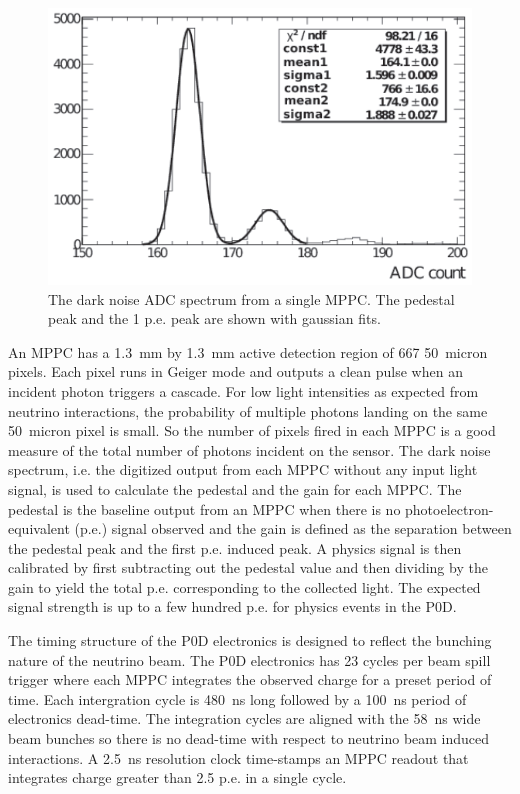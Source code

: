 \begin{figure}
\begin{center}
\includegraphics[width=6in]{./Figures/pedestal.png}
\end{center}
\caption{The dark noise ADC spectrum from a single MPPC. The pedestal
  peak and the 1 p.e. peak are shown with gaussian fits.}
\label{fig:pedestal}
\end{figure}

An MPPC has a 1.3~mm by 1.3~mm active detection region of 667 50~micron
pixels. Each pixel runs in Geiger mode and outputs a clean pulse when
an incident photon triggers a cascade. For low light intensities as
expected from neutrino interactions, the probability of multiple
photons landing on the same 50~micron pixel is small. So the number of
pixels fired in each MPPC is a good measure of the total number of
photons incident on the sensor. The dark noise spectrum, i.e. the digitized output from each MPPC
without any input light signal, is used to calculate the pedestal and
the gain for each MPPC. The pedestal is the baseline output from an MPPC when
there is no photoelectron-equivalent (p.e.) signal observed and the gain is
defined as the separation between the pedestal peak and the first
p.e. induced peak. A physics signal is then calibrated by first
subtracting out the pedestal value and then dividing by the gain to
yield the total p.e. corresponding to the collected light. The
expected signal strength is up to a few hundred p.e. for physics
events in the P0D. 

The timing structure of the P0D electronics is designed to reflect the
bunching nature of the neutrino beam. The P0D electronics has 23
cycles per beam spill trigger where each MPPC integrates the observed
charge for a preset period of time. Each intergration cycle is
480~ns long followed by a 100~ns period of electronics dead-time. The
integration cycles are aligned with the 58~ns wide beam bunches so there is no
dead-time with respect to neutrino beam induced interactions. A 2.5~ns
resolution clock time-stamps an MPPC readout that integrates charge
greater than 2.5 p.e. in a single cycle. 


